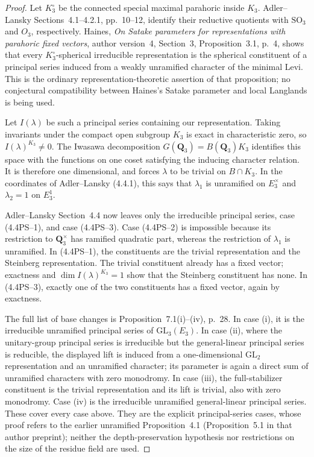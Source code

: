 \begin{proof}
Let $K_3^\circ$ be the connected special maximal parahoric inside $K_3$.
Adler--Lansky Sections~4.1--4.2.1, pp.~10--12, identify their reductive
quotients with $\mathrm{SO}_3$ and $O_3$, respectively.
Haines, \emph{On Satake parameters for representations with parahoric
fixed vectors}, author version~4, Section~3, Proposition~3.1, p.~4,
shows that every $K_3^\circ$-spherical irreducible representation is the
spherical constituent of a principal series induced from a weakly
unramified character of the minimal Levi. This is the ordinary
representation-theoretic assertion of that proposition; no conjectural
compatibility between Haines's Satake parameter and local Langlands is
being used.

Let $I(\lambda)$ be such a principal series containing our representation.
Taking invariants under the compact open subgroup $K_3$ is exact in
characteristic zero, so $I(\lambda)^{K_3}\ne0$. The Iwasawa decomposition
$G(\mathbf Q_3)=B(\mathbf Q_3)K_3$ identifies this space with the
functions on one coset satisfying the inducing character relation.
It is therefore one dimensional, and forces $\lambda$ to be trivial on
$B\cap K_3$. In the coordinates of Adler--Lansky (4.4.1), this says
that $\lambda_1$ is unramified on $E_3^\times$ and $\lambda_2=1$ on
$E_3^1$.

Adler--Lansky Section~4.4 now leaves only the irreducible principal
series, case (4.4PS--1), and case (4.4PS--3). Case (4.4PS--2) is
impossible because its restriction to $\mathbf Q_3^\times$ has ramified
quadratic part, whereas the restriction of $\lambda_1$ is unramified.
In (4.4PS--1), the constituents are the trivial representation and the
Steinberg representation. The trivial constituent already has a fixed
vector; exactness and $\dim I(\lambda)^{K_3}=1$ show that the Steinberg
constituent has none. In (4.4PS--3), exactly one of the two constituents
has a fixed vector, again by exactness.

The full list of base changes is Proposition~7.1(i)--(iv), p.~28.
In case (i), it is the irreducible unramified principal series of
$\mathrm{GL}_3(E_3)$. In case (ii), where the unitary-group principal
series is irreducible but the general-linear principal series is
reducible, the displayed lift is induced from a one-dimensional
$\mathrm{GL}_2$ representation and an unramified character; its
parameter is again a direct sum of unramified characters with zero
monodromy. In case (iii), the full-stabilizer constituent is the trivial
representation and its lift is trivial, also with zero monodromy.
Case (iv) is the irreducible unramified general-linear principal series.
These cover every case above. They are the explicit principal-series
cases, whose proof refers to the earlier unramified Proposition~4.1
(Proposition~5.1 in that author preprint); neither the depth-preservation
hypothesis nor restrictions on the size of the residue field are used.


\end{proof}

